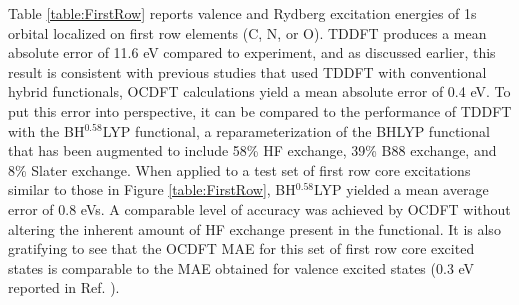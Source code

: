 \documentclass[8.5pt,twoside,twocolumn]{article}
\begin{document}
Table \ref{table:FirstRow} reports valence and Rydberg excitation energies of 1s orbital localized on first row elements (C, N, or O). TDDFT produces a mean absolute error of 11.6 eV compared to experiment, and as discussed earlier, this result is consistent with previous studies that used TDDFT with conventional hybrid functionals,\cite{besley_self-consistent-field_2009} OCDFT calculations yield a mean absolute error of 0.4 eV. To put this error into perspective, it can be compared to the performance of TDDFT with the BH$^{0.58}$LYP functional,\cite{besley_time-dependent_2009} a reparameterization of the BHLYP functional that has been augmented to include 58\% HF exchange, 39\% B88 exchange, and 8\% Slater exchange. When applied to a test set of first row core excitations similar to those in Figure \ref{table:FirstRow}, BH$^{0.58}$LYP yielded a mean average error of 0.8 eVs. A comparable level of accuracy was achieved by OCDFT without altering the inherent amount of HF exchange present in the functional. It is also gratifying to see that the OCDFT MAE for this set of first row core excited states is comparable to the MAE obtained for valence excited states (0.3 eV reported in Ref. ).
\end{document}
